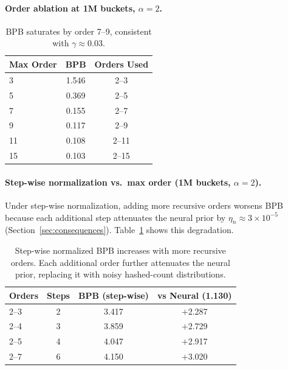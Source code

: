 \documentclass[11pt]{article}
\begin{document}
\paragraph{Order ablation at 1M buckets, $\alpha = 2$.}

\begin{table}[h]
\centering
\caption{BPB saturates by order 7--9, consistent with $\gamma \approx 0.03$.}
\begin{tabular}{lcc}
\toprule
Max Order & BPB & Orders Used \\
\midrule
3 & 1.546 & 2--3 \\
5 & 0.369 & 2--5 \\
7 & 0.155 & 2--7 \\
9 & 0.117 & 2--9 \\
11 & 0.108 & 2--11 \\
15 & 0.103 & 2--15 \\
\bottomrule
\end{tabular}
\end{table}

\paragraph{Step-wise normalization vs.\ max order (1M buckets, $\alpha = 2$).}

Under step-wise normalization, adding more recursive orders worsens BPB because each additional step attenuates the neural prior by $\eta_n \approx 3 \times 10^{-5}$ (Section~\ref{sec:consequences}). Table~\ref{tab:stepwise_sweep} shows this degradation.

\begin{table}[h]
\centering
\caption{Step-wise normalized BPB increases with more recursive orders. Each additional order further attenuates the neural prior, replacing it with noisy hashed-count distributions.}
\label{tab:stepwise_sweep}
\begin{tabular}{lccc}
\toprule
Orders & Steps & BPB (step-wise) & vs Neural (1.130) \\
\midrule
2--3 & 2 & 3.417 & $+$2.287 \\
2--4 & 3 & 3.859 & $+$2.729 \\
2--5 & 4 & 4.047 & $+$2.917 \\
2--7 & 6 & 4.150 & $+$3.020 \\
\bottomrule
\end{tabular}
\end{table}
\end{document}
